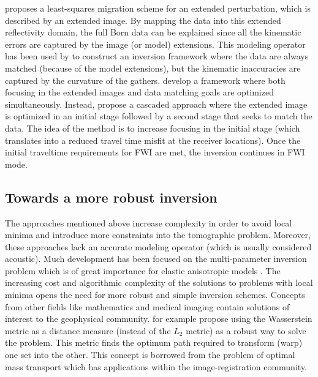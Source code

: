 \cite{GPR:GPR698} proposes a least-squares migration scheme for an extended perturbation, which
 is described by an extended image. By mapping the data into this extended reflectivity domain, 
 the full Born data can be explained since all the kinematic errors are captured by the image (or model)
extensions. This modeling operator has been used by \cite{BiondiAli:2014} to construct
an inversion framework where the data are always matched (because of the model extensions), 
 but the kinematic inaccuracies are captured by the curvature of the gathers. 
 \cite{FleuryPerrone} develop a framework where both focusing in the  extended images and data matching 
goals are optimized simultaneously. Instead, \cite{diaz2013data} propose a cascaded 
approach where the extended image is optimized in an initial stage followed by a second stage 
that seeks to match the data. The idea of the method is to increase focusing in the initial stage
 (which translates into a reduced travel time misfit at the receiver locations). Once the
initial traveltime requirements for FWI are met, the inversion continues in FWI mode. 

\subsection{Towards a more robust inversion}

The approaches mentioned above increase complexity in order to avoid local minima
 and introduce more constraints into the tomographic problem.  
 Moreover, these approaches lack an accurate modeling operator
(which is usually considered acoustic). Much development has been focused on the multi-parameter inversion
problem which is of great importance for elastic anisotropic models \citep{barnes2008feasibility,guasch,Kamath,espen,yuting}. 
The increasing cost  and algorithmic complexity of the solutions to problems with local minima opens
the need for more robust and simple inversion schemes. Concepts from 
other fields like mathematics and medical imaging contain solutions of interest 
to the geophysical community. \cite{engquist2013application} for example propose using the 
Wasserstein metric as a distance measure (instead of the $L_2$ metric) as a robust 
way to solve the problem. This metric finds the optimum path required to
 transform (warp) one set into the other. This concept is borrowed from the problem of optimal mass transport
which has applications within the image-registration community. 

